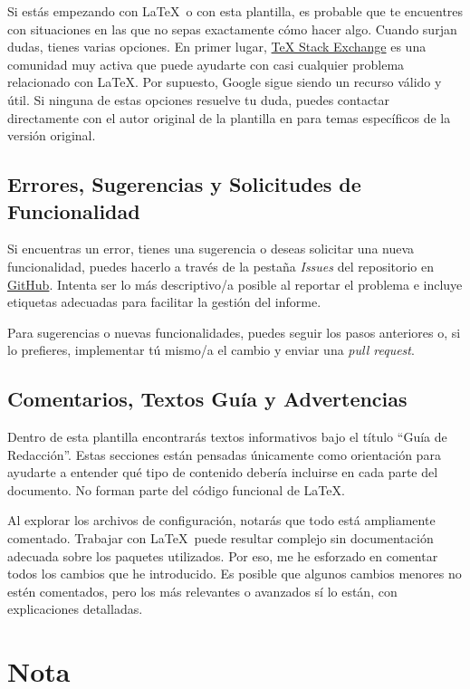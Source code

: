 {Si estás empezando con \LaTeX~o con esta plantilla, es probable que te encuentres con situaciones en las que no sepas exactamente cómo hacer algo. Cuando surjan dudas, tienes varias opciones. En primer lugar, \href{https://tex.stackexchange.com/}{TeX Stack Exchange} es una comunidad muy activa que puede ayudarte con casi cualquier problema relacionado con \LaTeX. Por supuesto, Google sigue siendo un recurso válido y útil. Si ninguna de estas opciones resuelve tu duda, puedes contactar directamente con el autor original de la plantilla en \textit{\textcolor{blue}{}} para temas específicos de la versión original.

\subsection{Errores, Sugerencias y Solicitudes de Funcionalidad}

Si encuentras un error, tienes una sugerencia o deseas solicitar una nueva funcionalidad, puedes hacerlo a través de la pestaña \textit{Issues} del repositorio en \href{https://github.com/enriiquee/umu-thesis}{GitHub}. Intenta ser lo más descriptivo/a posible al reportar el problema e incluye etiquetas adecuadas para facilitar la gestión del informe.

Para sugerencias o nuevas funcionalidades, puedes seguir los pasos anteriores o, si lo prefieres, implementar tú mismo/a el cambio y enviar una \textit{pull request}. 

\subsection{Comentarios, Textos Guía y Advertencias}

Dentro de esta plantilla encontrarás textos informativos bajo el título ``Guía de Redacción''. Estas secciones están pensadas únicamente como orientación para ayudarte a entender qué tipo de contenido debería incluirse en cada parte del documento. No forman parte del código funcional de \LaTeX.

Al explorar los archivos de configuración, notarás que todo está ampliamente comentado. Trabajar con \LaTeX~puede resultar complejo sin documentación adecuada sobre los paquetes utilizados. Por eso, me he esforzado en comentar todos los cambios que he introducido. Es posible que algunos cambios menores no estén comentados, pero los más relevantes o avanzados sí lo están, con explicaciones detalladas.

\section{Nota}

}

